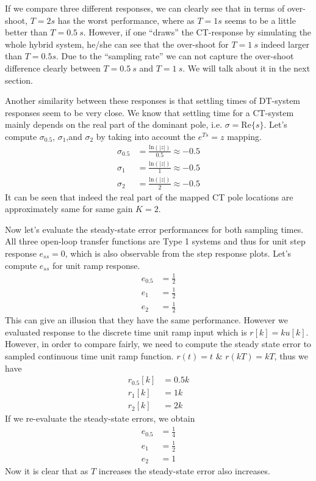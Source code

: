 \documentclass[twoside]{article}
\begin{document}
If we compare three different responses, we can clearly see that
in terms of over-shoot, $T=2s$ has the worst performance,
where as $T = 1 s$ seems to be a little better than $T = 0.5 \ s$. 
However, if one ``draws'' the CT-response by simulating the
whole hybrid system, he/she can see that the over-shoot for $T=1 \ s$
indeed larger than $T = 0.5 s$. Due to the ``sampling rate''
we can not capture the over-shoot difference clearly between $T = 0.5 \ s$
and $T = 1 \ s$. We will talk about it in the next section.

Another similarity between these responses is that settling times
of DT-system responses seem to be very close. We know that settling 
time for a CT-system mainly depends on the real part of the
dominant pole, i.e. $\sigma = \mathrm{Re} \lbrace s \rbrace$. 
Let's compute $\sigma_{0.5}$, $\sigma_{1}$,and $\sigma_2$ by taking 
into account the $e^{Ts} = z$ mapping.
%
\begin{align*}
\sigma_{0.5} &= \frac{\mathrm{ln}(|z|) }{0.5} \approx -0.5
\\
\sigma_{1} &= \frac{\mathrm{ln}(|z|) }{1} \approx -0.5
\\
\sigma_{2} &= \frac{\mathrm{ln}(|z|) }{2} \approx -0.5
\end{align*}
%
It can be seen that indeed the real part of the mapped CT
pole locations are approximately same for same gain $K=2$.

Now let's evaluate the steady-state error performances for both
sampling times. All three open-loop transfer functions are Type 1
systems and thus for unit step response $e_{ss} = 0$, which is also
observable from the step response plots. Let's compute $e_{ss}$
for unit ramp response.
%
\begin{align*}
  e_{0.5} &= \frac{1}{2} \\
  e_{1} &= \frac{1}{2} \\
  e_{2} &= \frac{1}{2}
\end{align*}
%
This can give an illusion that they have the same performance. However
we evaluated response to the discrete time unit ramp input which is 
$r[k] = k u[k]$. However, in order to compare fairly, we need to compute the
steady state error to sampled continuous time unit ramp function. 
$r(t) = t$ \& $r(kT) = kT$, thus we have
%
\begin{align*}
  r_{0.5}[k] &= 0.5 k \\
  r_{1}[k] &= 1 k \\
  r_{2}[k] &= 2 k
\end{align*}
%
If we re-evaluate the steady-state errors, we obtain
%
%
\begin{align*}
  e_{0.5} &= \frac{1}{4} \\
  e_{1} &= \frac{1}{2} \\
  e_{2} &= 1
\end{align*}
%
Now it is clear that as $T$ increases the steady-state error 
also increases. 
\end{document}
